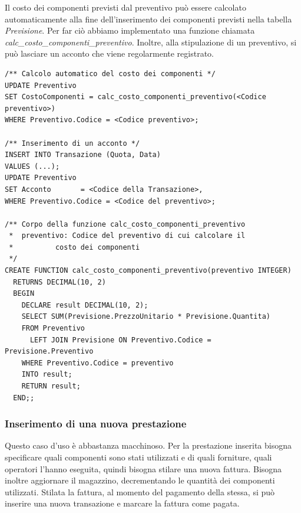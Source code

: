 				Il costo dei componenti previsti dal preventivo può essere calcolato automaticamente alla fine dell'inserimento dei componenti previsti nella tabella \emph{Previsione}. Per far ciò abbiamo implementato una funzione chiamata \emph{calc\_costo\_componenti\_preventivo}.
				Inoltre, alla stipulazione di un preventivo, si può lasciare un acconto che viene regolarmente registrato.

				\begin{lstlisting}
/** Calcolo automatico del costo dei componenti */
UPDATE Preventivo 
SET CostoComponenti = calc_costo_componenti_preventivo(<Codice preventivo>)
WHERE Preventivo.Codice = <Codice preventivo>;

/** Inserimento di un acconto */
INSERT INTO Transazione (Quota, Data)
VALUES (...);
UPDATE Preventivo
SET Acconto       = <Codice della Transazione>,
WHERE Preventivo.Codice = <Codice del preventivo>;

/** Corpo della funzione calc_costo_componenti_preventivo
 *  preventivo: Codice del preventivo di cui calcolare il 
 * 			costo dei componenti
 */
CREATE FUNCTION calc_costo_componenti_preventivo(preventivo INTEGER)
  RETURNS DECIMAL(10, 2)
  BEGIN
    DECLARE result DECIMAL(10, 2);
    SELECT SUM(Previsione.PrezzoUnitario * Previsione.Quantita)
    FROM Preventivo
      LEFT JOIN Previsione ON Preventivo.Codice = Previsione.Preventivo
    WHERE Preventivo.Codice = preventivo
    INTO result;
    RETURN result;
  END;;
				\end{lstlisting}


      \subsubsection{Inserimento di una nuova prestazione}
        Questo caso d'uso è abbastanza macchinoso. Per la prestazione inserita bisogna specificare quali componenti sono stati utilizzati e di quali forniture, quali operatori l'hanno eseguita, quindi bisogna stilare una nuova fattura. Bisogna inoltre aggiornare il magazzino, decrementando le quantità dei componenti utilizzati.
        Stilata la fattura, al momento del pagamento della stessa, si può inserire una nuova transazione e marcare la fattura come pagata.

